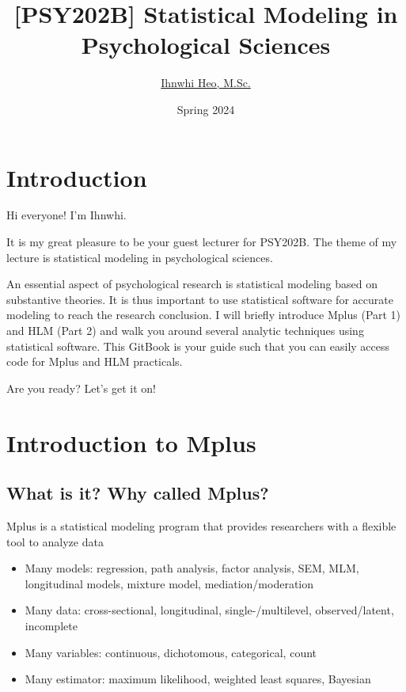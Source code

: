 \documentclass[
]{book}
\title{{[}PSY202B{]} Statistical Modeling in Psychological Sciences}
\author{\href{https://ihnwhiheo.github.io/}{Ihnwhi Heo, M.Sc.}}
\date{Spring 2024}
\begin{document}
\maketitle

{
\setcounter{tocdepth}{1}
\tableofcontents
}
\hypertarget{introduction}{%
\chapter{Introduction}\label{introduction}}

Hi everyone! I'm Ihnwhi.

It is my great pleasure to be your guest lecturer for PSY202B. The theme of my lecture is statistical modeling in psychological sciences.

An essential aspect of psychological research is statistical modeling based on substantive theories. It is thus important to use statistical software for accurate modeling to reach the research conclusion. I will briefly introduce Mplus (Part 1) and HLM (Part 2) and walk you around several analytic techniques using statistical software. This GitBook is your guide such that you can easily access code for Mplus and HLM practicals.

Are you ready? Let's get it on!

\hypertarget{introduction-to-mplus}{%
\chapter{Introduction to Mplus}\label{introduction-to-mplus}}

\hypertarget{what-is-it-why-called-mplus}{%
\section{What is it? Why called Mplus?}\label{what-is-it-why-called-mplus}}

Mplus is a statistical modeling program that provides researchers with a flexible tool to analyze data

\begin{itemize}
\item
  Many models: regression, path analysis, factor analysis, SEM, MLM, longitudinal models, mixture model, mediation/moderation
\item
  Many data: cross-sectional, longitudinal, single-/multilevel, observed/latent, incomplete
\item
  Many variables: continuous, dichotomous, categorical, count
\item
  Many estimator: maximum likelihood, weighted least squares, Bayesian
\end{itemize}
\end{document}
